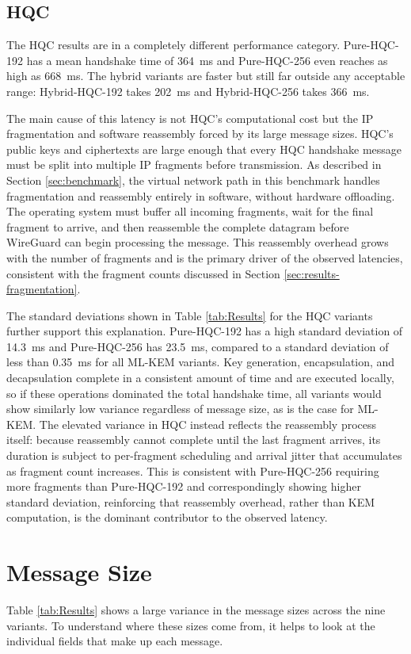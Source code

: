\subsection{HQC} 
The HQC results are in a completely different performance category. Pure-HQC-192 has a mean handshake time of \qty{364}{ms} and Pure-HQC-256 even reaches as high as \qty{668}{ms}. The hybrid variants are faster but still far outside any acceptable range: Hybrid-HQC-192 takes \qty{202}{ms} and Hybrid-HQC-256 takes \qty{366}{ms}. 

The main cause of this latency is not HQC's computational cost but the IP fragmentation and software reassembly forced by its large message sizes. HQC's public keys and ciphertexts are large enough that every HQC handshake message must be split into multiple IP fragments before transmission. As described in Section \ref{sec:benchmark}, the virtual network path in this benchmark handles fragmentation and reassembly entirely in software, without hardware offloading. The operating system must buffer all incoming fragments, wait for the final fragment to arrive, and then reassemble the complete datagram before WireGuard can begin processing the message. This reassembly overhead grows with the number of fragments and is the primary driver of the observed latencies, consistent with the fragment counts discussed in Section \ref{sec:results-fragmentation}. 

The standard deviations shown in Table \ref{tab:Results} for the HQC variants further support this explanation. Pure-HQC-192 has a high standard deviation of \qty{14.3}{ms} and Pure-HQC-256 has \qty{23.5}{ms}, compared to a standard deviation of less than \qty{0.35}{ms} for all ML-KEM variants. Key generation, encapsulation, and decapsulation complete in a consistent amount of time and are executed locally, so if these operations dominated the total handshake time, all variants would show similarly low variance regardless of message size, as is the case for ML-KEM. The elevated variance in HQC instead reflects the reassembly process itself: because reassembly cannot complete until the last fragment arrives, its duration is subject to per-fragment scheduling and arrival jitter that accumulates as fragment count increases. This is consistent with Pure-HQC-256 requiring more fragments than Pure-HQC-192 and correspondingly showing higher standard deviation, reinforcing that reassembly overhead, rather than KEM computation, is the dominant contributor to the observed latency.

\section{Message Size}
Table \ref{tab:Results} shows a large variance in the message sizes across the nine variants. To understand where these sizes come from, it helps to look at the individual fields that make up each message.

